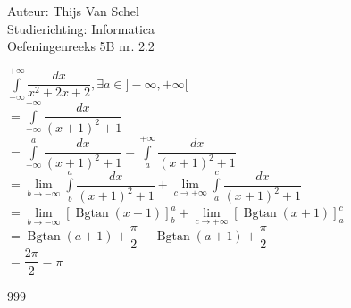\documentclass[a4paper]{article}
\newcommand{\dint}{\displaystyle\int}
\newcommand{\bdint}{\displaystyle\int\limits_{-\infty}^{+\infty}}
\begin{document}
  
\noindent \large Auteur: Thijs Van Schel \\
\noindent \large Studierichting: Informatica\\
\noindent \large Oefeningenreeks 5B nr. 2.2\\

\medskip

\normalsize

$\bdint \dfrac{dx}{x^2+2x+2}, \exists a \in ]-\infty, +\infty[$\\

$ = \bdint \dfrac{dx}{(x+1)^2 + 1}$\\

$ = \dint\limits_{-\infty}^a \dfrac{dx}{(x+1)^2 + 1} + \dint\limits_a^{+\infty} \dfrac{dx}{(x+1)^2 + 1}$\\

$ = \lim\limits_{b \rightarrow -\infty} \dint\limits_b^a \dfrac{dx}{(x+1)^2 + 1} + \lim\limits_{c \rightarrow +\infty} \dint\limits_a^c \dfrac{dx}{(x+1)^2 + 1}$\\

$ = \lim\limits_{b \rightarrow -\infty}[\operatorname{Bgtan}(x+1)]^a_b + \lim\limits_{c \rightarrow +\infty}[\operatorname{Bgtan}(x+1)]^c_a$\\

$ = \operatorname{Bgtan}(a+1) + \dfrac{\pi}{2} - \operatorname{Bgtan}(a+1) + \dfrac{\pi}{2}$\\

$ = \dfrac{2\pi}{2} = \pi$\\

\begin{thebibliography}{999}
\end{thebibliography}
\end{document}
